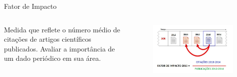 \begin{frame}{Fator de Impacto}

	\begin{columns}
		Medida que reflete o número médio de citações de artigos científicos publicados.
		Avaliar a importância de um dado periódico em sua área.
		\begin{figure}[hb]
			\includegraphics[width=1\textwidth]{figures/fi.jpg}
		\end{figure}
	\end{columns}

\end{frame}

